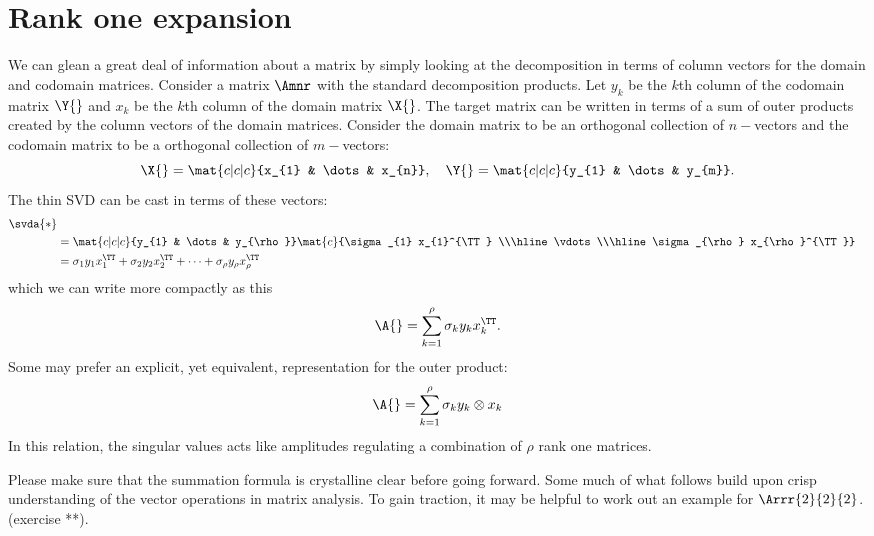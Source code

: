 \section{Rank one expansion}
We can glean a great deal of information about a matrix by simply looking at the decomposition in terms of column vectors for the domain and codomain matrices. Consider a matrix $\Amnr$ with the standard decomposition products. Let $y_{k}$ be the $k$th column of the codomain matrix $\Y{}$ and $x_{k}$ be the $k$th column of the domain matrix $\X{}$. The target matrix can be written in terms of a sum of outer products created by the column vectors of the domain matrices. Consider the domain matrix to be an orthogonal collection of $n-$vectors and the codomain matrix to be a orthogonal collection of $m-$vectors:
\begin{equation}
  \X{} = \mat{c|c|c}{x_{1} & \dots & x_{n}}, \quad \Y{} = \mat{c|c|c}{y_{1} & \dots & y_{m}}.
\end{equation}
The thin SVD can be cast in terms of these vectors:
\begin{equation}
  \begin{split}
    \svda{*} \\
    &= \mat{c|c|c}{y_{1} & \dots & y_{\rho}} \mat{c}{\sigma_{1} x_{1}^{\TT} \\\hline \vdots \\\hline \sigma_{\rho} x_{\rho}^{\TT}} \\
    &= \sigma_{1} y_{1} x_{1}^{\TT} + \sigma_{2} y_{2} x_{2}^{\TT} + \dots + \sigma_{\rho} y_{\rho} x_{\rho}^{\TT}
  \end{split}
\end{equation}
which we can write more compactly as this
\begin{equation}
  \A{} = \sum_{k=1}^{\rho}{ \sigma_{k} y_{k} x_{k}^{\TT} }.
  \label{eq:45:resolve}
\end{equation}
Some may prefer an explicit, yet equivalent, representation for the outer product:
\begin{equation}
  \A{} = \sum_{k=1}^{\rho}{ \sigma_{k} y_{k} \otimes x_{k} }
\end{equation}
In this relation, the singular values acts like amplitudes regulating a combination of $\rho$ rank one matrices.

Please make sure that the summation formula is crystalline clear before going forward. Some much of what follows build upon crisp understanding of the vector operations in matrix analysis. To gain traction, it may be helpful to work out an example for $\Arrr{2}{2}{2}$. (exercise **).
\cite[p. **]{Laub}


